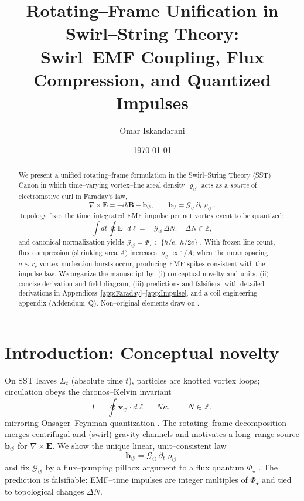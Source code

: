 \documentclass[12pt]{article}
\title{\Large\bfseries Rotating--Frame Unification in Swirl--String Theory:\\
Swirl--EMF Coupling, Flux Compression, and Quantized Impulses}
\author{Omar Iskandarani}
\date{\today}
\newcommand{\vswirl}{\mathbf{v}_{\!\boldsymbol{\circlearrowleft}}}
\newcommand{\rc}{r_c}
\newcommand{\bmvarrho}{\bm{\varrho}_{\!\boldsymbol{\circlearrowleft}}}
\newcommand{\Gsw}{\mathcal{G}_{\!\boldsymbol{\circlearrowleft}}}
\begin{document}
\maketitle

\begin{abstract}
We present a unified rotating--frame formulation in the Swirl--String Theory (SST) Canon in which time--varying vortex--line areal density $\bmvarrho$ acts as a \emph{source} of electromotive curl in Faraday's law,
\[
    \nabla\times\mathbf E=-\partial_t\mathbf B-\mathbf b_{\!\boldsymbol{\circlearrowleft}},
    \qquad
    \mathbf b_{\!\boldsymbol{\circlearrowleft}}=\Gsw\,\partial_t\bmvarrho.
\]
Topology fixes the time--integrated EMF impulse per net vortex event to be quantized:
\[
    \int dt\,\oint \mathbf E\!\cdot d\boldsymbol\ell=-\,\Gsw\,\Delta N,\quad \Delta N\in\mathbb Z,
\]
and canonical normalization yields $\Gsw=\Phi_\star\in\{h/e,\;h/2e\}$ \cite{Deaver1961,Doll1961}. With frozen line count, flux compression (shrinking area $A$) increases $\bmvarrho\propto 1/A$; when the mean spacing $a\sim \rc$ vortex nucleation bursts occur, producing EMF spikes consistent with the impulse law. We organize the manuscript by: (i) conceptual novelty and units, (ii) concise derivation and field diagram, (iii) predictions and falsifiers, with detailed derivations in Appendices~\ref{app:Faraday}–\ref{app:Impulse}, and a coil engineering appendix (Addendum~Q).
Non–original elements draw on \cite{Onsager1949,Feynman1955,LandauLifshitzEDCM,Deaver1961,Doll1961,Jacobson1995,Padmanabhan2010,Verlinde2011,Verlinde2017}.
\end{abstract}

\section{Introduction: Conceptual novelty}
    On SST leaves $\Sigma_t$ (absolute time $t$), particles are knotted vortex loops; circulation obeys the chronos--Kelvin invariant
    \begin{equation}
    \Gamma=\oint \vswirl\!\cdot d\boldsymbol\ell=N\kappa,\qquad N\in\mathbb Z,
    \label{eq:Kelvin}
    \end{equation}
    mirroring Onsager--Feynman quantization \cite{Onsager1949,Feynman1955}. The rotating--frame decomposition merges centrifugal and (swirl) gravity channels and motivates a long--range source $\mathbf b_{\!\boldsymbol{\circlearrowleft}}$ for $\nabla\times\mathbf E$. We show the unique linear, unit--consistent law
    \begin{equation}
    \boxed{\ \mathbf b_{\!\boldsymbol{\circlearrowleft}}=\Gsw\,\partial_t\bmvarrho\ }
    \label{eq:b-law}
    \end{equation}
    and fix $\Gsw$ by a flux–pumping pillbox argument to a flux quantum $\Phi_\star$ \cite{Deaver1961,Doll1961}. The prediction is falsifiable: EMF--time impulses are integer multiples of $\Phi_\star$ and tied to topological changes $\Delta N$.
\end{document}
